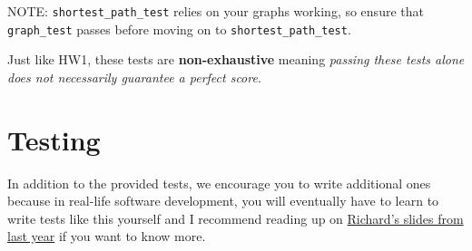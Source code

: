 \documentclass{article}
\begin{document}
   NOTE: \verb|shortest_path_test| relies on your graphs working, so ensure that \verb|graph_test| passes before moving on to \verb|shortest_path_test|.
   
   Just like HW1,  these tests are \textbf{non-exhaustive} meaning \textit{passing these tests alone does not necessarily guarantee a perfect score}.
   
	\section{Testing}
	In addition to the provided tests, we encourage you to write additional ones because in real-life software development, you will eventually have to learn to write tests like this yourself and I recommend reading up on \href{https://cornelltech.github.io/CS5112-F18/Lectures/clinic_readability.pdf}{Richard's slides from last year} if you want to know more.
	
	
\end{document}
